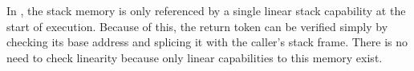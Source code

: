 \documentclass{jfp}
\begin{document}

In \stktokens{}, the stack memory is only referenced by a single linear stack capability at the start of execution.
Because of this, the return token can be verified simply by checking its base address and splicing it with the caller's stack frame.
There is no need to check linearity because only linear capabilities to this memory exist.
\end{document}
